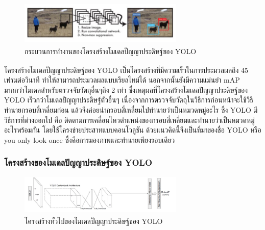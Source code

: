 \begin{figure}[!ht]
    \centering
    \includegraphics[width=0.7\textwidth]{chapter2/images/yolo.jpg}
    \caption[กระบวนการทำงานของโครงสร้างโมเดลปัญญาประดิษฐ์ของ YOLO]{กระบวนการทำงานของโครงสร้างโมเดลปัญญาประดิษฐ์ของ YOLO\textsuperscript{\cite{yolo}}}
    \label{fig:yolo}
\end{figure}

โครงสร้างโมเดลปัญญาประดิษฐ์ของ YOLO\textsuperscript{\cite{yolo}} เป็นโครงสร้างที่มีความเร็วในการประมวลผลถึง 45 เฟรมต่อวินาที ทำให้สามารถประมวลผลแบบเรียลไทม์ได้ นอกจากนั้นยังมีความแม่นยำ mAP 
มากกว่าโมเดลสำหรับตรวจจับวัตถุอื่นๆถึง 2 เท่า ซึ่งเหตุผลที่โครงสร้างโมเดลปัญญาประดิษฐ์ของ YOLO เร็วกว่าโมเดลปัญญาประดิษฐ์ตัวอื่นๆ 
เนื่องจากการตรวจจับวัตถุในวิธีการก่อนหน้าจะใช้วิธีทำนายกรอบสี่เหลี่ยมก่อน แล้วจึงค่อยนำกรอบสี่เหลี่ยมไปทำนายว่าเป็นหมวดหมู่อะไร ซึ่ง YOLO มีวิธีการที่ต่างออกไป คือ 
ติดตามการเคลื่อนไหวตำแหน่งของกรอบสี่เหลี่ยมและทำนายว่าเป็นหมวดหมู่อะไรพร้อมกัน โดยใช้โครงข่ายประสาทแบบคอนโวลูชัน ด้วยแนวคิดนี้จึงเป็นที่มาของชื่อ YOLO 
หรือ you only look once ซึ่งคือการมองภาพและทำนายเพียงรอบเดียว
\subsubsection*{โครงสร้างของโมเดลปัญญาประดิษฐ์ของ YOLO} 
\begin{figure}[!ht]
    \centering
    \includegraphics[width=0.7\textwidth]{chapter2/images/yolo_architecture.jpg}
    \caption[โครงสร้างทั่วไปของโมเดลปัญญาประดิษฐ์ของ YOLO]{โครงสร้างทั่วไปของโมเดลปัญญาประดิษฐ์ของ YOLO\textsuperscript{\cite{ssd_yolo_pic}}}
    \label{fig:yolo_architecture}
\end{figure}

